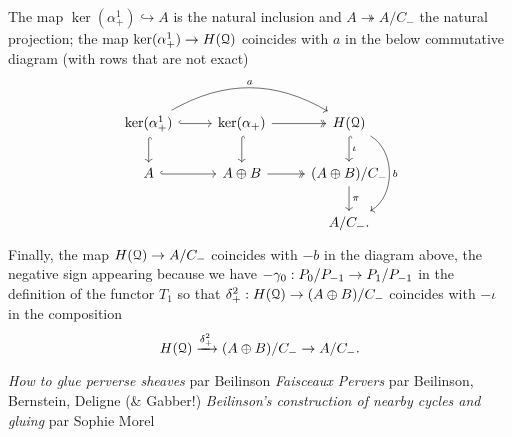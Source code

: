 \documentclass[deligne.tex]{subfiles}
\begin{document}
The map $\ker(\alpha_+^1)\hookrightarrow A$ is the natural inclusion
and $A\twoheadrightarrow A/C_-$ the natural projection;
the map $\ker(\alpha_+^1)\rightarrow H(\mathcal Q)$ coincides with $a$ in the
below commutative diagram (with rows that are not exact)
\begin{equation*}\begin{tikzcd}
	\ker(\alpha_+^1)\arrow[rr,bend left,"a"]\arrow[r,hook]\arrow[d,hook]
	&\ker(\alpha_+)\arrow[r,twoheadrightarrow]\arrow[d,hook]
	&H(\mathcal Q)\arrow[d,hook,"\iota"]\arrow[dd,bend left=60pt,"b"] \\
	A\arrow[r,hook]&A\oplus B\arrow[r,twoheadrightarrow]
	&(A\oplus B)/C_-\arrow[d,"\pi"] \\
	&&A/C_-.
\end{tikzcd}\end{equation*}
Finally, the map $H(\mathcal Q)\rightarrow A/C_-$ coincides with $-b$ in the diagram
above, the negative sign appearing because we have
$-\gamma_0:P_0/P_{-1}\rightarrow P_1/P_{-1}$ in the definition of the functor $T_1$
so that $\delta_+^2:H(\mathcal Q)\rightarrow(A\oplus B)/C_-$
coincides with $-\iota$ in the composition
\begin{equation*}
	H(\mathcal Q)\xrightarrow{\delta_+^2}(A\oplus B)/C_-\rightarrow A/C_-.
\end{equation*}




\begin{thebibliography}{BBD}
	 \emph{How to glue perverse sheaves} par Beilinson
	 \textit{Faisceaux Pervers}
	par Beilinson, Bernstein, Deligne (\& Gabber!)
	 \emph{Beilinson's construction of nearby cycles and gluing} par Sophie Morel
\end{thebibliography}
\end{document}
